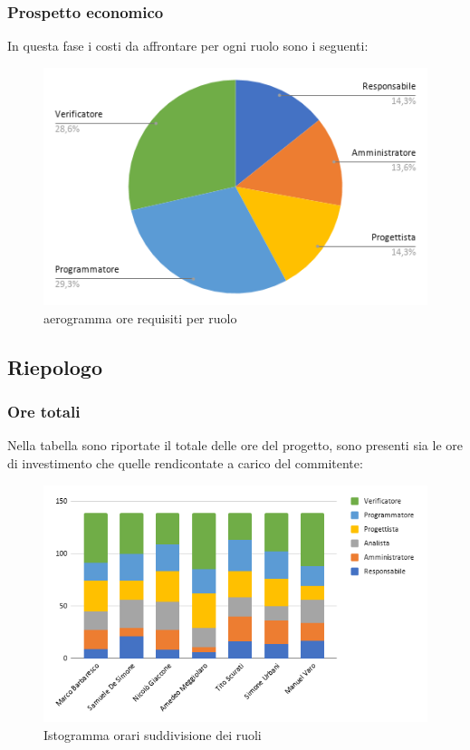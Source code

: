 \subsubsection{Prospetto economico}
In questa fase i costi da affrontare per ogni ruolo sono i seguenti:

\begin{figure}[!h]
    \caption{aerogramma ore requisiti per ruolo}
    \vspace{5px}
    \includegraphics[scale=0.5]{../../../Images/Diagrammi/Diagramma a torta/ore validificazione.png}
    \centering
\end{figure}  


\subsection{Riepologo}
    \subsubsection{Ore totali}
        Nella tabella sono riportate il totale delle ore del progetto, sono presenti sia le ore di investimento che quelle rendicontate a carico del commitente:
        \begin{figure}[!h]
            \caption{Istogramma orari suddivisione dei ruoli}
            \vspace{5px}
            \includegraphics[scale=0.6]{../../../Images/Diagrammi/Istogrammi/ore totali.png}
            \centering
        \end{figure}

